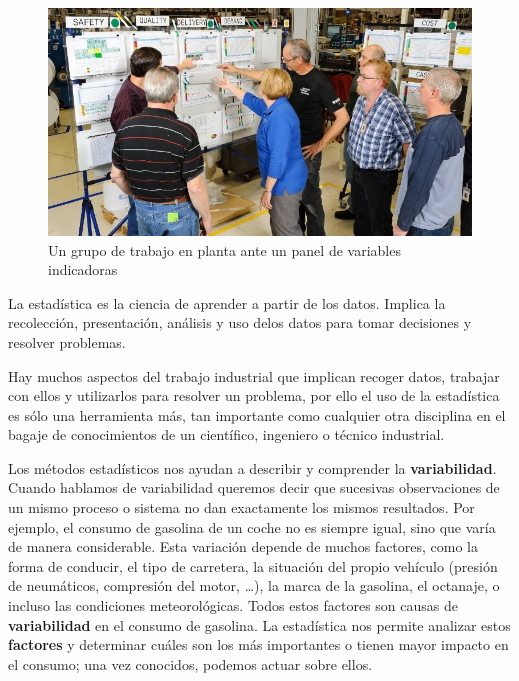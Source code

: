 \documentclass[
  letterpaper,
]{scrbook}
\begin{document}
\begin{figure}

{\centering \includegraphics{./01-imagenes/1520188654204.jpg}

}

\caption{Un grupo de trabajo en planta ante un panel de variables
indicadoras}

\end{figure}

La estadística es la ciencia de aprender a partir de los datos. Implica
la recolección, presentación, análisis y uso delos datos para tomar
decisiones y resolver problemas.

Hay muchos aspectos del trabajo industrial que implican recoger datos,
trabajar con ellos y utilizarlos para resolver un problema, por ello el
uso de la estadística es sólo una herramienta más, tan importante como
cualquier otra disciplina en el bagaje de conocimientos de un
científico, ingeniero o técnico industrial.

Los métodos estadísticos nos ayudan a describir y comprender la
\textbf{variabilidad}. Cuando hablamos de variabilidad queremos decir
que sucesivas observaciones de un mismo proceso o sistema no dan
exactamente los mismos resultados. Por ejemplo, el consumo de gasolina
de un coche no es siempre igual, sino que varía de manera considerable.
Esta variación depende de muchos factores, como la forma de conducir, el
tipo de carretera, la situación del propio vehículo (presión de
neumáticos, compresión del motor, \ldots), la marca de la gasolina, el
octanaje, o incluso las condiciones meteorológicas. Todos estos factores
son causas de \textbf{variabilidad} en el consumo de gasolina. La
estadística nos permite analizar estos \textbf{factores} y determinar
cuáles son los más importantes o tienen mayor impacto en el consumo; una
vez conocidos, podemos actuar sobre ellos.
\end{document}
